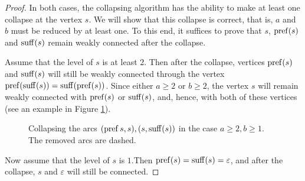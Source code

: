 \begin{proof}
In both cases, the collapsing algorithm has the ability to make at least one collapse at the vertex $ s $. We will show that this collapse is correct, that is, $ a $ and $ b $ must be reduced by at least one. To this end, it suffices to prove that $ s $, $ \operatorname{pref} (s) $ and $ \operatorname{suff} (s) $ remain weakly connected after the collapse.

Assume that the level of $ s $ is at least $ 2 $. Then after the collapse, vertices $ \operatorname{pref}(s) $ and $ \operatorname{suff} (s) $ will still be weakly connected through the vertex $ \operatorname{pref} (\operatorname{suff} (s)) = \operatorname{suff} (\operatorname{pref} (s)) $. Since either $ a \ge 2 $ or $ b \ge 2 $, the vertex $ s $ will remain weakly connected with $ \operatorname{pref} (s) $ or $ \operatorname{suff} (s) $, and, hence, with both of these vertices (see an example in Figure \ref{fig:collapsea2b1}).

\begin{figure}[ht]
\begin{center}

\end{center}
    
\caption{Collapsing the arcs $(\operatorname{pref}{s}, s), (s, \operatorname{suff}(s))$ in the case $a \ge 2, b \ge 1$. The removed arcs are dashed. }\label{fig:collapsea2b1}
\end{figure}

Now assume that the level of $s$ is $1$.Then $ \operatorname{pref} (s) = \operatorname{suff} (s) = \varepsilon $, and after the collapse, $s$ and $ \varepsilon $ will still be connected.
\end{proof}

